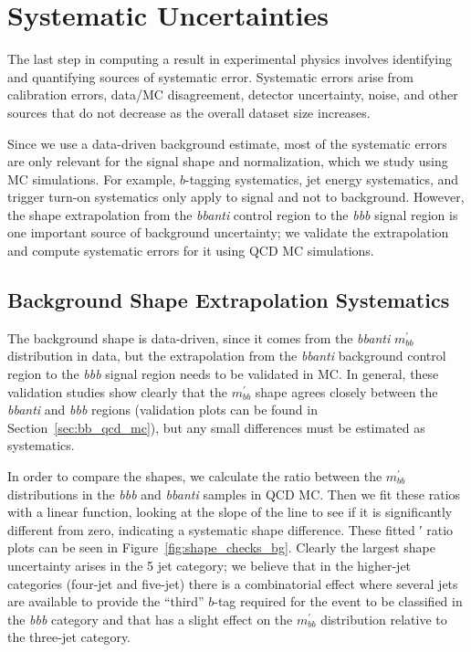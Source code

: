  

\chapter[Systematic Uncertainties]{Systematic Uncertainties}

The last step in computing a result in experimental physics involves identifying
and quantifying sources of systematic error.  Systematic errors arise from calibration
errors, data/MC disagreement, detector uncertainty, noise, and other sources
that do not decrease as the overall dataset size increases.  

Since we use a data-driven background estimate, most of the systematic errors
are only relevant for the signal shape and normalization, which we study using 
MC simulations.  For example, $b$-tagging systematics, jet energy systematics, 
and trigger turn-on systematics only apply to signal and not to background.  
However, the shape extrapolation from the \textit{bbanti} control region to the
\textit{bbb} signal region is one important source of background uncertainty;
we validate the extrapolation and compute systematic errors for it using QCD MC simulations.

\section{Background Shape Extrapolation Systematics}
\label{sec:background_syst}
The background shape is data-driven, since it comes from the \textit{bbanti} $m^{'}_{bb}$ distribution in data, but the
extrapolation from the \textit{bbanti} background control region to the \textit{bbb} signal region needs to be validated
in MC. In general, these validation studies show clearly that the $m^{'}_{bb}$ shape agrees closely between the
\textit{bbanti} and \textit{bbb} regions (validation plots can be found in Section~\ref{sec:bb_qcd_mc}), but any small differences must
be estimated as systematics.

In order to compare the shapes, we calculate the ratio between the $m^{'}_{bb}$ distributions in the \textit{bbb} and
\textit{bbanti} samples in QCD MC. Then we fit these ratios with a linear function, looking at the slope of the
line to see if it is significantly different from zero, indicating a systematic shape difference. These fitted ′
ratio plots can be seen in Figure~\ref{fig:shape_checks_bg}.  Clearly the largest shape uncertainty arises in
the 5 jet category; we believe that in the higher-jet categories (four-jet and five-jet) there is a combinatorial
effect where several jets are available to provide the ``third'' $b$-tag required for the event to be classified
in the \textit{bbb} category and that has a slight effect on the $m^{'}_{bb}$ distribution relative to the
three-jet category.


